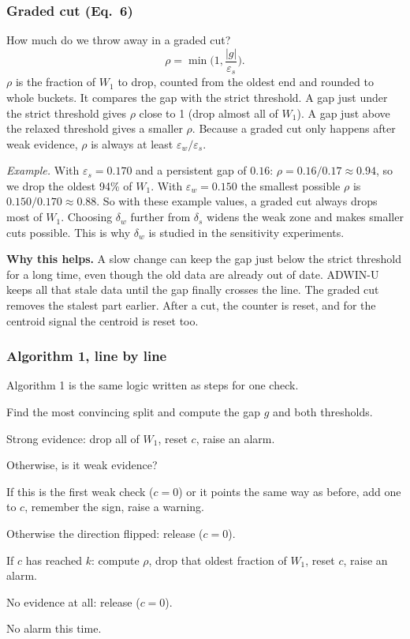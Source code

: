 \documentclass[11pt,a4paper]{article}
\begin{document}
\subsubsection*{Graded cut (Eq.~6)}
How much do we throw away in a graded cut?
\[
\rho=\min\Big(1,\frac{|g|}{\varepsilon_s}\Big).
\]
$\rho$ is the fraction of $W_1$ to drop, counted from the oldest end and rounded to whole buckets. It compares the gap with the strict threshold. A gap just under the strict threshold gives $\rho$ close to 1 (drop almost all of $W_1$). A gap just above the relaxed threshold gives a smaller $\rho$. Because a graded cut only happens after weak evidence, $\rho$ is always at least $\varepsilon_w/\varepsilon_s$.

\emph{Example.} With $\varepsilon_s=0.170$ and a persistent gap of $0.16$: $\rho=0.16/0.17\approx0.94$, so we drop the oldest 94\% of $W_1$. With $\varepsilon_w=0.150$ the smallest possible $\rho$ is $0.150/0.170\approx0.88$. So with these example values, a graded cut always drops most of $W_1$. Choosing $\delta_w$ further from $\delta_s$ widens the weak zone and makes smaller cuts possible. This is why $\delta_w$ is studied in the sensitivity experiments.

\textbf{Why this helps.} A slow change can keep the gap just below the strict threshold for a long time, even though the old data are already out of date. ADWIN-U keeps all that stale data until the gap finally crosses the line. The graded cut removes the stalest part earlier. After a cut, the counter is reset, and for the centroid signal the centroid is reset too.

\subsubsection*{Algorithm 1, line by line}
Algorithm 1 is the same logic written as steps for one check.
\begin{description}[leftmargin=1.8cm, labelwidth=1.6cm]
\item[1, 2] Find the most convincing split and compute the gap $g$ and both thresholds.
\item[3, 4] Strong evidence: drop all of $W_1$, reset $c$, raise an alarm.
\item[5] Otherwise, is it weak evidence?
\item[6, 7] If this is the first weak check ($c=0$) or it points the same way as before, add one to $c$, remember the sign, raise a warning.
\item[8, 9] Otherwise the direction flipped: release ($c=0$).
\item[11 to 14] If $c$ has reached $k$: compute $\rho$, drop that oldest fraction of $W_1$, reset $c$, raise an alarm.
\item[16, 17] No evidence at all: release ($c=0$).
\item[19] No alarm this time.
\end{description}
\end{document}
